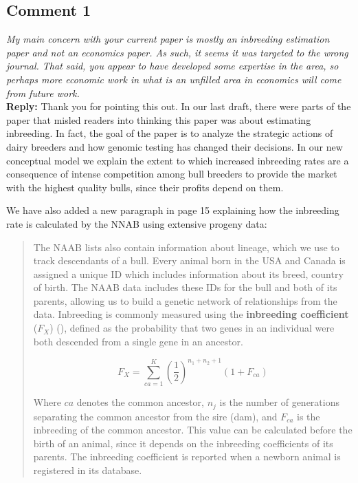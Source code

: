 \documentclass[12pt,letterpaper]{article}
\begin{document}
\subsection*{Comment 1}
\textit{My main concern with your current paper is mostly an inbreeding estimation paper and not an economics paper.  As such, it seems it was targeted to the wrong journal.  That said, you appear to have developed some expertise in the area, so perhaps more economic work in what is an unfilled area in economics will come from future work.}\\

\textbf{Reply:} Thank you for pointing this out. In our last draft, there were parts of the paper that misled readers into thinking this paper was about estimating inbreeding. In fact, the goal of the paper is to analyze the strategic actions of dairy breeders and how genomic testing has changed their decisions. In our new conceptual model we explain the extent to which increased inbreeding rates are a consequence of intense competition among bull breeders to provide the market with the highest quality bulls, since their profits depend on them.

We have also added a new paragraph in page 15 explaining how the inbreeding rate is calculated by the NNAB using extensive progeny data:

\begin{quote}
    The NAAB lists also contain information about lineage, which we use to track descendants of a bull. Every animal born in the USA and Canada is assigned a unique ID which includes information about its breed, country of birth. 
The NAAB data includes these IDs for the bull and both of its parents, allowing us to build a genetic network of relationships from the data. 
Inbreeding is commonly measured using the \textbf{inbreeding coefficient} ($F_{X}$) (\cite{Wright1922}), defined as the probability that two genes in an individual were both descended from a single gene in an ancestor.

\begin{equation}
        F_{X}=\sum_{ca=1}^{K}\left(\dfrac{1}{2}\right)^{n_{1}+n_{2}+1}(1+F_{ca})
\end{equation}

Where $ca$ denotes the common ancestor, $n_{j}$ is the number of generations separating the common ancestor from the sire (dam), and $F_{ca}$ is the inbreeding of the common ancestor. 
This value can be calculated before the birth of an animal, since it depends on the inbreeding coefficients of its parents. The inbreeding coefficient is reported when a newborn animal is registered in its database.
\end{quote}
\end{document}

